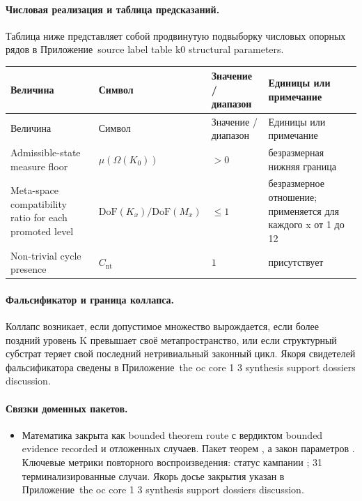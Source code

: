 \paragraph{Числовая реализация и таблица предсказаний.}
Таблица ниже представляет собой продвинутую подвыборку числовых опорных рядов в Приложение~source label table k0 structural parameters.
\begin{longtable}{@{}L{0.27\textwidth}L{0.15\textwidth}L{0.24\textwidth}L{0.16\textwidth}@{}}
\toprule
Величина & Символ & Значение / диапазон & Единицы или примечание \\
\midrule
\endfirsthead
\toprule
Величина & Символ & Значение / диапазон & Единицы или примечание \\
\midrule
\endhead
Admissible-state measure floor & $\scriptstyle \mu(\Omega(K_0))$ & $> 0$ & безразмерная нижняя граница \\
Meta-space compatibility ratio for each promoted level & $\scriptstyle \mathrm{DoF}(K_x)/\allowbreak \mathrm{DoF}(M_x)$ & $\leq 1$ & безразмерное отношение; применяется для каждого x от 1 до 12 \\
Non-trivial cycle presence & $\scriptstyle C_{\mathrm{nt}}$ & $1$ & присутствует \\
\bottomrule
\end{longtable}

\paragraph{Фальсификатор и граница коллапса.}
Коллапс возникает, если допустимое множество вырождается, если более поздний уровень K превышает своё метапространство, или если структурный субстрат теряет свой последний нетривиальный законный цикл.
Якоря свидетелей фальсификатора сведены в Приложение~the oc core 1 3 synthesis support dossiers discussion.

\paragraph{Связки доменных пакетов.}
\begin{itemize}[leftmargin=1.6em,nosep]
\item Математика закрыта как bounded theorem route с вердиктом bounded evidence recorded и  отложенных случаев. Пакет теорем , а закон параметров . Ключевые метрики повторного воспроизведения: статус кампании ; 31 терминализированные случаи. Якорь досье закрытия указан в Приложение~the oc core 1 3 synthesis support dossiers discussion.
\end{itemize}

